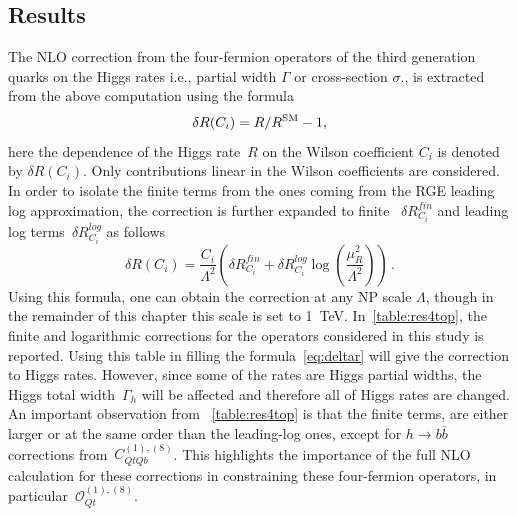 \subsection{Results}
The NLO correction from the four-fermion operators of the third generation quarks on the Higgs rates i.e.,  partial width $\Gamma$ or cross-section $\sigma$., is extracted from the above computation using the formula
\begin{equation}
	\delta R(C_i) = R/R^{\mathrm{SM}} -1,
	\label{eq:deltaR}
\end{equation}
here the dependence of  the Higgs rate~$R$ on the Wilson coefficient $C_i$ is denoted by $\delta R(C_i) $.  Only contributions linear in the Wilson coefficients are considered. In order to isolate the finite terms from the ones coming from the RGE leading log approximation, the correction is further expanded to finite ~$\delta R_{C_i}^{fin}$ and leading log terms~$\delta R_{C_i}^{log}$ as follows
\begin{equation}
	\delta R(C_i)= \frac{C_i}{\Lambda^2}\left(\delta R_{C_i}^{fin}+ \delta R_{C_i}^{log} \log\left(\frac{\mu_R^2}{\Lambda^2}\right)\right)\,.
	\label{eq:deltar}
\end{equation}
%
Using this formula, one can obtain the correction at any NP scale $\Lambda$, though in the remainder of this chapter this scale is set to \SI{1}{TeV}. In~\autoref{table:res4top}, the finite and logarithmic corrections for the operators considered in this study is reported. Using this table in filling the formula~\eqref{eq:deltar} will give the correction to Higgs rates.  However, since some of the rates are Higgs partial widths, the Higgs total width~$\Gamma_h$ will be affected and therefore all of Higgs rates are changed.
%
An important observation from ~\autoref{table:res4top} is that the finite terms, are either larger or at the same order than the leading-log ones, except for $h\to b\bar{b}$ corrections from~$C_{QtQb}^{(1),(8)}$. This highlights the importance of the full NLO calculation for these corrections in constraining these four-fermion operators, in particular~$\mathcal O_{Qt}^{(1),(8)}$. 

